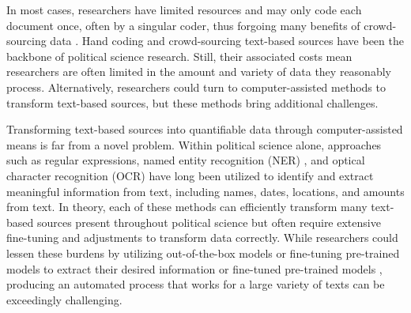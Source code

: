     In most cases, researchers have limited resources and may only code each document once, often by a singular coder, thus forgoing many benefits of crowd-sourcing data \citep{benoitCrowdsourcedTextAnalysis2016}. Hand coding and crowd-sourcing text-based sources have been the backbone of political science research. Still, their associated costs mean researchers are often limited in the amount and variety of data they reasonably process. Alternatively, researchers could turn to computer-assisted methods to transform text-based sources, but these methods bring additional challenges.

    Transforming text-based sources into quantifiable data through computer-assisted means is far from a novel problem. Within political science alone, approaches such as regular expressions, named entity recognition (NER) \citep{kerkvliet-etal-2020-mentions,jalalPerformanceComparisonCrowdworkers2020}, and optical character recognition (OCR) \citep{permaloffOpticalCharacterRecognition1992a} have long been utilized to identify and extract meaningful information from text, including names, dates, locations, and amounts from text. In theory, each of these methods can efficiently transform many text-based sources present throughout political science but often require extensive fine-tuning and adjustments to transform data correctly. While researchers could lessen these burdens by utilizing out-of-the-box models or fine-tuning pre-trained models to extract their desired information or fine-tuned pre-trained models \citep{laurerLessAnnotatingMore2023}, producing an automated process that works for a large variety of texts can be exceedingly challenging.

